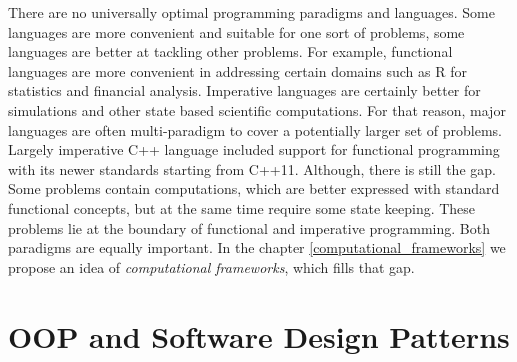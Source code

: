 \quad There are no universally optimal programming paradigms and languages. Some languages are more convenient and suitable for one sort of problems, some languages are better at tackling other problems. For example, functional languages are more convenient in addressing certain domains such as R for statistics and financial analysis. Imperative languages are certainly better for simulations and other state based scientific computations. For that reason, major languages are often multi-paradigm to cover a potentially larger set of problems. Largely imperative C++ language included support for functional programming with its newer standards starting from C++11.\newline\null
\quad Although, there is still the gap. Some problems contain computations, which are better expressed with standard functional concepts, but at the same time require some state keeping. These problems lie at the boundary of functional and imperative programming. Both paradigms are equally important. In the chapter \ref{computational_frameworks} we propose an idea of \textit{computational frameworks}, which fills that gap. 

\section{OOP and Software Design Patterns}
\label{background_oop_design}
